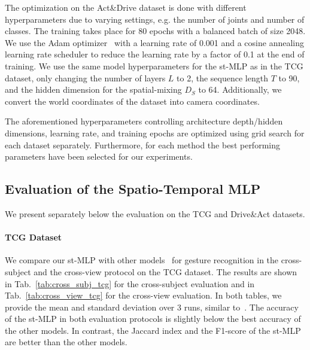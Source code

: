 \documentclass[letterpaper, 10 pt, conference]{ieeeconf}
\begin{document}
The optimization on the Act\&Drive dataset is done with different hyperparameters due to varying settings, e.g. the number of joints and number of classes. The training takes place for 80 epochs with a balanced batch of size 2048. We use the Adam optimizer~\cite{kingma2014adam} with a learning rate of 0.001 and a cosine annealing learning rate scheduler to reduce the learning rate by a factor of 0.1 at the end of training. We use the same model hyperparameters for the st-MLP as in the TCG dataset, only changing the number of layers $L$ to 2, the sequence length $T$ to 90, and the hidden dimension for the spatial-mixing $D_S$ to 64. Additionally, we convert the world coordinates of the dataset into camera coordinates.

The aforementioned hyperparameters controlling architecture depth/hidden dimensions, learning rate, and training epochs are optimized using grid search for each dataset separately. Furthermore, for each method the best performing parameters have been selected for our experiments.

\subsection{Evaluation of the Spatio-Temporal MLP}
\label{subsec:eval_mlp}

We present separately below the evaluation on the TCG and Drive\&Act datasets.

\paragraph{TCG Dataset}
\label{para:tcg_dataset_eval}
We compare our st-MLP with other models~\cite{wiederer2020traffic} for gesture recognition in the cross-subject and the cross-view protocol on the TCG dataset. The results are shown in Tab.~\ref{tab:cross_subj_tcg} for the cross-subject evaluation and in Tab.~\ref{tab:cross_view_tcg} for the cross-view evaluation. In both tables, we provide the mean and standard deviation over 3 runs, similar to~\cite{wiederer2020traffic}. The accuracy of the st-MLP in both evaluation protocols is slightly below the best accuracy of the other models. In contrast, the Jaccard index and the F1-score of the st-MLP are better than the other models.
\end{document}
